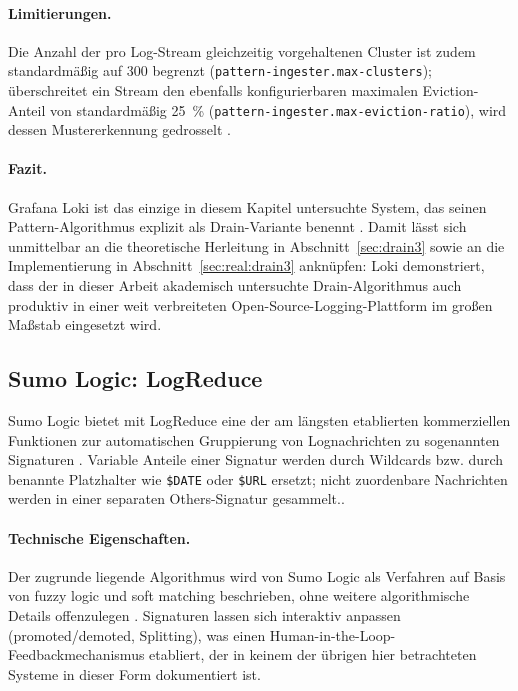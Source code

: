 \paragraph{Limitierungen.}
 Die Anzahl der pro Log-Stream gleichzeitig vorgehaltenen Cluster ist zudem standardmäßig auf 300 begrenzt (\texttt{pattern-ingester.max-clusters}); überschreitet ein Stream den ebenfalls konfigurierbaren maximalen Eviction-Anteil von standardmäßig 25~\% (\texttt{pattern-ingester.max-eviction-ratio}), wird dessen Mustererkennung gedrosselt \cite{grafanaLokiConfigureDoc}.


\paragraph{Fazit.}
Grafana Loki ist das einzige in diesem Kapitel untersuchte System, das seinen Pattern-Algorithmus explizit als Drain-Variante benennt \cite{grafanaLokiPatternIssue}. Damit lässt sich unmittelbar an die theoretische Herleitung in Abschnitt~\ref{sec:drain3} sowie an die Implementierung in Abschnitt~\ref{sec:real:drain3} anknüpfen: Loki demonstriert, dass der in dieser Arbeit akademisch untersuchte Drain-Algorithmus auch produktiv in einer weit verbreiteten Open-Source-Logging-Plattform im großen Maßstab eingesetzt wird.

\subsection{Sumo Logic: LogReduce}
\label{sec:sumologic_logreduce}

Sumo Logic bietet mit \glqq LogReduce\grqq{} eine der am längsten etablierten kommerziellen Funktionen zur automatischen Gruppierung von Lognachrichten zu sogenannten Signaturen \cite{sumologicLogReduceDetectPatterns}. Variable Anteile einer Signatur werden durch Wildcards bzw. durch benannte Platzhalter wie \texttt{\$DATE} oder \texttt{\$URL} ersetzt; nicht zuordenbare Nachrichten werden in einer separaten \glqq Others\grqq-Signatur gesammelt.\cite{sumologicLogReduceDetectPatterns}.

\paragraph{Technische Eigenschaften.}
Der zugrunde liegende Algorithmus wird von Sumo Logic als Verfahren auf Basis von \glqq fuzzy logic\grqq{} und \glqq soft matching\grqq{} beschrieben, ohne weitere algorithmische Details offenzulegen \cite{sumologicLogReduceDetectPatterns}. Signaturen lassen sich interaktiv anpassen (\glqq promoted\grqq/\glqq demoted\grqq, Splitting), was einen Human-in-the-Loop-Feedbackmechanismus etabliert, der in keinem der übrigen hier betrachteten Systeme in dieser Form dokumentiert ist.

